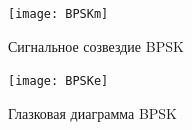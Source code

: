 \documentclass[10pt,a4paper]{article}
\begin{document}
\begin{figure}[h]\centering
	\texttt{[image: BPSKm]}
	\caption{Сигнальное созвездие BPSK}\label{fig.BPSKm}
\end{figure}                                                                                                                                                                                                                                                                                                                                                                                                                                                                                                                                                                                                                                                                                                                                                                                                                                                                                                                                                                                                                                                                                                                                                                                                                                                                                                                                                                                                                                                                        
\begin{figure}[h]\centering
	\texttt{[image: BPSKe]}
	\caption{Глазковая диаграмма BPSK}\label{fig.BPSKe}
\end{figure}                                                                                                                                                                                                                                                                                                                                                                                                                                                                                                                                                                                                                                                                                                                                                                                                                                                                                                                                                                                                                                                                                                                                                                                                                                                                                                                                                                                                                                                                        
\end{document}
